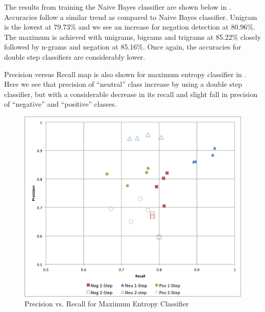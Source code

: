 The results from training the Naive Bayes classifier are shown below in
. Accuracies follow a similar trend as compared to Naive
Bayes classifier. Unigram is the lowest at 79.73\% and we see an increase for
negation detection at 80.96\%. The maximum is achieved with unigrams, bigrams
and trigrams at 85.22\% closely followed by n-grams and negation at 85.16\%. Once
again, the accuracies for double step classifiers are considerably lower.


Precision versus Recall map is also shown for maximum entropy classifier in
.  Here we see that precision of ``neutral'' class increase by
using a double step classifier, but with a considerable decrease in its recall
and slight fall in precision of ``negative'' and ``positive'' classes.

\begin{figure}[h!]
\centering
\includegraphics[width=\textwidth]{img/ME_PvsR.png}
\caption{Precision vs. Recall for Maximum Entropy Classifier}
\label{fig:me_pr}
\end{figure}
